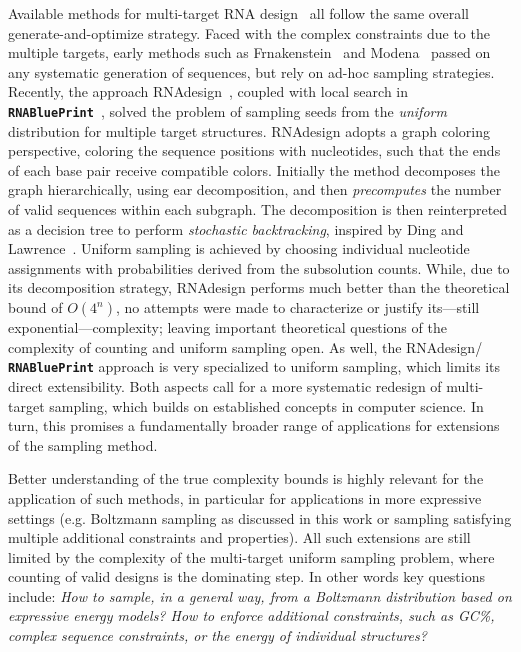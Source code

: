 \documentclass[twocolumn]{bmcart}%
\newcommand{\Def}[1]{\emph{#1}}
\newcommand{\parHead}[1]{\Final{\paragraph{#1}}}
\newcommand{\Final}[1]{\begingroup\color{red!70!black}#1\endgroup}
\renewcommand{\Final}[1]{}
\newcommand{\Nuc}[1]{{\sf #1}}
\newcommand{\Cb}{\Nuc{C}}
\newcommand{\Gb}{\Nuc{G}}
\newcommand{\GCb}{\Gb\Cb}
\newcommand{\Software}[1]{{\ttfamily #1}}
\newcommand{\RNAblueprint}{{\tt \bfseries{}\color{black!85} RNA\textcolor{blue!70!black}{Blue}Print}}
\newcommand{\citep}[1]{\cite{#1}}
\begin{document}
\parHead{Specificities and similarities of multi-target design.}
Available methods for multi-target RNA design~\citep{Lyngsoe2012,HoenerzuSiederdissen2013,Taneda2015,Hammer2017} all follow the same overall generate-and-optimize strategy.
%
Faced with the complex constraints due to the multiple targets, early methods such as \Software{Frnakenstein}~\citep{Lyngsoe2012} and \Software{Modena}~\citep{Taneda2015} passed on any systematic generation of sequences, but rely on ad-hoc sampling strategies.
%
Recently, the approach \Software{RNAdesign}~\citep{HoenerzuSiederdissen2013}, coupled with local
search in \RNAblueprint{}~\citep{Hammer2017}, solved the
problem of sampling seeds from the \emph{uniform} distribution for multiple
target structures. \Software{RNAdesign} adopts a graph coloring perspective,
coloring the sequence positions with nucleotides, such that the ends of each base pair receive compatible colors. Initially the method decomposes the graph hierarchically, using ear decomposition, and then \Def{precomputes} the number of valid sequences
within each subgraph. The decomposition is then reinterpreted as a
decision tree to perform \Def{stochastic backtracking}, inspired by
Ding and Lawrence~\citep{Ding2003}. Uniform sampling is achieved by
choosing individual nucleotide assignments with probabilities derived
from the subsolution counts. While, due to its decomposition strategy, 
\Software{RNAdesign} performs much better than the theoretical bound of $O(4^n)$, no attempts were made to characterize or justify its---still exponential---complexity; leaving important theoretical questions of the complexity of counting and uniform sampling open.
As well, the \Software{RNAdesign}/\RNAblueprint{} approach is very specialized to uniform sampling, which limits its direct extensibility. Both aspects call for a more systematic redesign of multi-target sampling, which builds on established concepts in computer science. In turn, this promises a fundamentally broader range of applications for extensions of the sampling method.

\parHead{Motivation.}
Better understanding of the true complexity bounds is highly relevant for the application of such methods, in particular for applications in more expressive settings (e.g. Boltzmann sampling as discussed in this work or sampling satisfying multiple additional constraints and properties). All such extensions are still limited by the complexity of the multi-target uniform sampling problem, where counting of valid designs is the dominating step. In other words key questions include: \emph{How to sample, in a general way, from a Boltzmann distribution based on expressive energy models? How to enforce additional constraints, such as \GCb\%, complex sequence constraints, or the energy of individual structures?}
\end{document}
